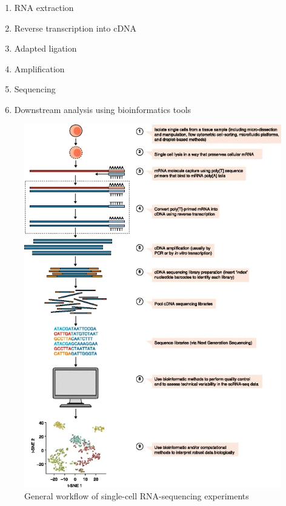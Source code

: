 \begin{enumerate}
   \item RNA extraction
   \item Reverse transcription into cDNA
   \item Adapted ligation
   \item Amplification
   \item Sequencing
   \item Downstream analysis using bioinformatics tools
\end{enumerate}

\begin{figure}[!htb]
\begin{center}
\includegraphics{../figures/scrna_protocol.png}
\end{center}
\caption{General workflow of single-cell RNA-sequencing experiments \citep{scrna_seq}}
\label{fig:SC_RNA}
\end{figure}
\FloatBarrier

